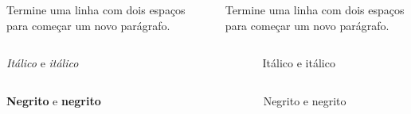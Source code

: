 \documentclass[
]{book}
\begin{document}
\begin{columns}

\begin{column}

Termine uma linha com dois espaços para
começar um novo parágrafo.

\end{column}

\begin{column}

~

\end{column}

\begin{column}

Termine uma linha com dois espaços para começar um novo parágrafo.

\end{column}

\end{columns}

\begin{columns}

\begin{column}

\emph{Itálico} e \emph{itálico}

\end{column}

\begin{column}

~

\end{column}

\begin{column}

Itálico e itálico

\end{column}

\end{columns}

\begin{columns}

\begin{column}

\textbf{Negrito} e \textbf{negrito}

\end{column}

\begin{column}

~

\end{column}

\begin{column}

Negrito e negrito

\end{column}

\end{columns}
\end{document}
